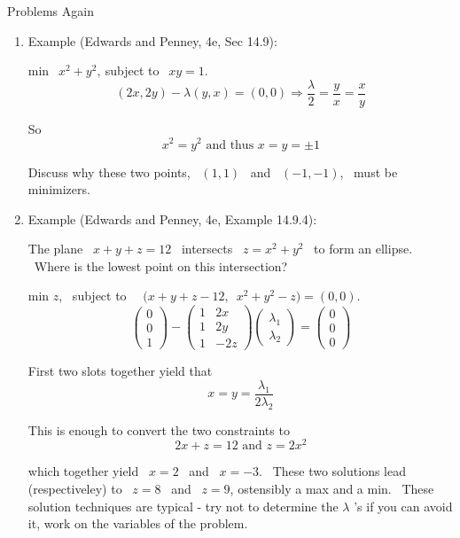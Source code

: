 \documentclass[12pt,thmsa]{article}
\begin{document}
\vspace{1pt}

\vspace{1pt}Problems Again

\vspace{1pt}

\begin{enumerate}
\item  Example (Edwards and Penney, 4e, Sec 14.9):

min $\ \ x^{2}+y^{2},\ $subject to $\ \ xy=1$.
\[
(2x,2y)-\lambda (y,x)=(0,0)\Rightarrow \frac{\lambda }{2}=\frac{y}{x}=\frac{x%
}{y}
\]

So
\[
x^{2}=y^{2}\text{ \ and thus \ }x=y=\pm 1
\]

Discuss why these two points, \ $(1,1)$ \ and \ $(-1,-1)$, \ must be
minimizers.\bigskip

\item  Example (Edwards and Penney, 4e, Example 14.9.4):

The plane \ $x+y+z=12$ \ intersects \ $z=x^{2}+y^{2}$ \ to form an ellipse.
\ Where is the lowest point on this intersection?

min $z$, \ subject to \ \ $(x+y+z-12,$\ $x^{2}+y^{2}-z)=(0,0)$.
\[
\left(
\begin{array}{r}
0 \\
0 \\
1
\end{array}
\right) -\left(
\begin{array}{rr}
1 & 2x \\
1 & 2y \\
1 & -2z
\end{array}
\right) \left(
\begin{array}{r}
\lambda _{1} \\
\lambda _{2}
\end{array}
\right) =\left(
\begin{array}{r}
0 \\
0 \\
0
\end{array}
\right)
\]

First two slots together yield that
\[
x=y=\frac{\lambda _{1}}{2\lambda _{2}}
\]

This is enough to convert the two constraints to
\[
2x+z=12\text{ \ and \ }z=2x^{2}
\]

which together yield \ $x=2$ \ and \ $x=-3$. \ These two solutions lead
(respectiveley) to \ $z=8$ \ and \ $z=9$, ostensibly a max and a min. \
These solution techniques are typical - try not to determine the $\lambda $%
's if you can avoid it, work on the variables of the problem.\bigskip


\end{enumerate}
\end{document}
